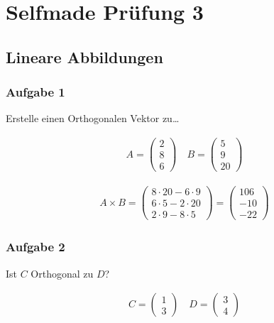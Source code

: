 \chapter{Selfmade Prüfung 3}

\section{Lineare Abbildungen}

\subsection{Aufgabe 1}

Erstelle einen Orthogonalen Vektor zu\dots

\begin{align*}
    A = \begin{pmatrix}
            2 \\ 8 \\ 6
        \end{pmatrix} \quad B = \begin{pmatrix}
                                    5 \\ 9 \\ 20
                                \end{pmatrix}
\end{align*}

\begin{align*}
    A \times B = \begin{pmatrix}
                     8 \cdot 20 - 6 \cdot 9 \\
                     6 \cdot 5 - 2 \cdot 20 \\
                     2 \cdot 9 - 8 \cdot 5
                 \end{pmatrix} = \begin{pmatrix}
                                     106 \\ -10 \\ -22
                                 \end{pmatrix}
\end{align*}

\subsection{Aufgabe 2}

Ist $C$ Orthogonal zu $D$?

\begin{align*}
    C = \begin{pmatrix}
            1 \\ 3
        \end{pmatrix} \quad D = \begin{pmatrix}
                                    3 \\ 4
                                \end{pmatrix}
\end{align*}

